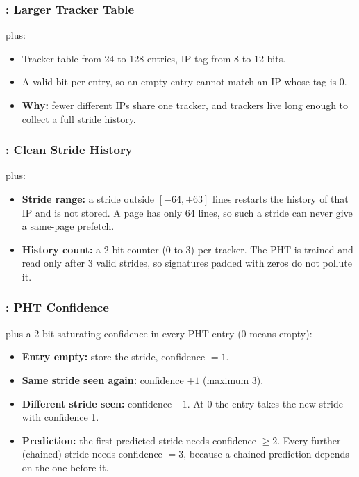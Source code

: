 \subsubsection{: Larger Tracker Table}
 plus:
\begin{itemize}
  \item Tracker table from 24 to 128 entries, IP tag from 8 to 12 bits.
  \item A valid bit per entry, so an empty entry cannot match an IP whose tag is 0.
  \item \textbf{Why:} fewer different IPs share one tracker, and trackers live long enough to collect a full stride history.
\end{itemize}

\subsubsection{: Clean Stride History}
 plus:
\begin{itemize}
  \item \textbf{Stride range:} a stride outside $[-64, +63]$ lines restarts the history of that IP and is not stored.
        A page has only 64 lines, so such a stride can never give a same-page prefetch.
  \item \textbf{History count:} a 2-bit counter (0 to 3) per tracker. The PHT is trained and read only after 3 valid
        strides, so signatures padded with zeros do not pollute it.
\end{itemize}

\subsubsection{: PHT Confidence}
 plus a 2-bit saturating confidence in every PHT entry (0 means empty):
\begin{itemize}
  \item \textbf{Entry empty:} store the stride, confidence $=1$.
  \item \textbf{Same stride seen again:} confidence $+1$ (maximum 3).
  \item \textbf{Different stride seen:} confidence $-1$. At 0 the entry takes the new stride with confidence 1.
  \item \textbf{Prediction:} the first predicted stride needs confidence $\ge 2$. Every further (chained) stride needs
        confidence $=3$, because a chained prediction depends on the one before it.
\end{itemize}

